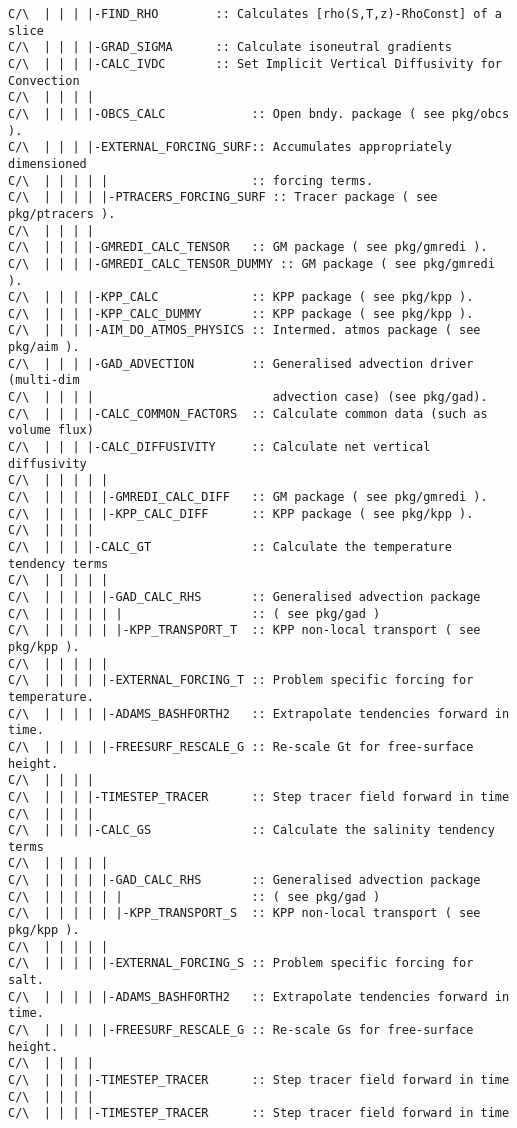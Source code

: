 {\begin{verbatim}
C/\  | | | |-FIND_RHO        :: Calculates [rho(S,T,z)-RhoConst] of a slice
C/\  | | | |-GRAD_SIGMA      :: Calculate isoneutral gradients
C/\  | | | |-CALC_IVDC       :: Set Implicit Vertical Diffusivity for Convection
C/\  | | | |
C/\  | | | |-OBCS_CALC            :: Open bndy. package ( see pkg/obcs ).
C/\  | | | |-EXTERNAL_FORCING_SURF:: Accumulates appropriately dimensioned 
C/\  | | | | |                    :: forcing terms.
C/\  | | | | |-PTRACERS_FORCING_SURF :: Tracer package ( see pkg/ptracers ).
C/\  | | | |
C/\  | | | |-GMREDI_CALC_TENSOR   :: GM package ( see pkg/gmredi ).
C/\  | | | |-GMREDI_CALC_TENSOR_DUMMY :: GM package ( see pkg/gmredi ). 
C/\  | | | |-KPP_CALC             :: KPP package ( see pkg/kpp ).
C/\  | | | |-KPP_CALC_DUMMY       :: KPP package ( see pkg/kpp ).
C/\  | | | |-AIM_DO_ATMOS_PHYSICS :: Intermed. atmos package ( see pkg/aim ).
C/\  | | | |-GAD_ADVECTION        :: Generalised advection driver (multi-dim
C/\  | | | |                         advection case) (see pkg/gad).
C/\  | | | |-CALC_COMMON_FACTORS  :: Calculate common data (such as volume flux)
C/\  | | | |-CALC_DIFFUSIVITY     :: Calculate net vertical diffusivity
C/\  | | | | |
C/\  | | | | |-GMREDI_CALC_DIFF   :: GM package ( see pkg/gmredi ).
C/\  | | | | |-KPP_CALC_DIFF      :: KPP package ( see pkg/kpp ).
C/\  | | | |
C/\  | | | |-CALC_GT              :: Calculate the temperature tendency terms
C/\  | | | | |
C/\  | | | | |-GAD_CALC_RHS       :: Generalised advection package 
C/\  | | | | | |                  :: ( see pkg/gad )
C/\  | | | | | |-KPP_TRANSPORT_T  :: KPP non-local transport ( see pkg/kpp ).
C/\  | | | | |
C/\  | | | | |-EXTERNAL_FORCING_T :: Problem specific forcing for temperature.
C/\  | | | | |-ADAMS_BASHFORTH2   :: Extrapolate tendencies forward in time.
C/\  | | | | |-FREESURF_RESCALE_G :: Re-scale Gt for free-surface height.
C/\  | | | |
C/\  | | | |-TIMESTEP_TRACER      :: Step tracer field forward in time
C/\  | | | |
C/\  | | | |-CALC_GS              :: Calculate the salinity tendency terms
C/\  | | | | |
C/\  | | | | |-GAD_CALC_RHS       :: Generalised advection package 
C/\  | | | | | |                  :: ( see pkg/gad )
C/\  | | | | | |-KPP_TRANSPORT_S  :: KPP non-local transport ( see pkg/kpp ).
C/\  | | | | |
C/\  | | | | |-EXTERNAL_FORCING_S :: Problem specific forcing for salt.
C/\  | | | | |-ADAMS_BASHFORTH2   :: Extrapolate tendencies forward in time.
C/\  | | | | |-FREESURF_RESCALE_G :: Re-scale Gs for free-surface height.
C/\  | | | |
C/\  | | | |-TIMESTEP_TRACER      :: Step tracer field forward in time
C/\  | | | |
C/\  | | | |-TIMESTEP_TRACER      :: Step tracer field forward in time

\end{verbatim}}
